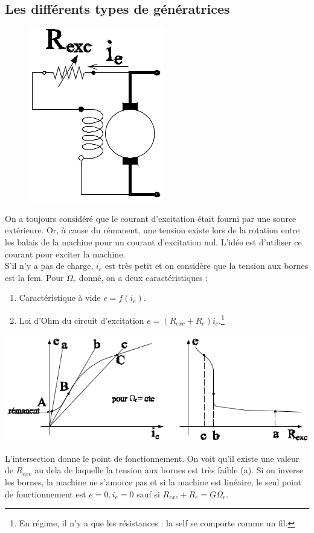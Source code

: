 	\subsection{Les différents types de génératrices}
	\begin{figure}
	\vspace{-5mm}
	\includegraphics[scale=0.34]{ch4/image16.png}
	\end{figure}
	On a toujours considéré que le courant d'excitation était fourni par une source 
	extérieure. Or, à cause du rémanent, une tension existe lors de la rotation entre 
	les balais de la machine pour un courant d'excitation nul. L'idée est d'utiliser 
	ce courant pour exciter la machine.\\
	S'il n'y a pas de charge, $i_e$ est très petit et on considère que la tension aux 
	bornes est la fem. Pour $\Omega_r$ donné, on a deux caractéristiques :
	\begin{enumerate}
	\item Caractéristique à vide $e = f(i_e)$.
	\item Loi d'Ohm du circuit d’excitation $e=(R_{exc}+R_e)i_e$.\footnote{En régime, 
	il n'y a que les résistances : la self se comporte comme un fil.}
	\end{enumerate}
	\begin{center}
	\includegraphics[scale=0.37]{ch4/image17.png}
	\end{center}
	L'intersection donne le point de fonctionnement. On voit qu'il existe une valeur 
	de $R_{exc}$ au dela de laquelle la tension aux bornes est très faible (a). Si 
	on inverse les bornes, la machine ne s'amorce pas et si la machine est linéaire, 
	le seul point de fonctionnement est $e=0,i_e=0$ sauf si $R_{exc}+R_e=G\Omega_r$.\\
	
